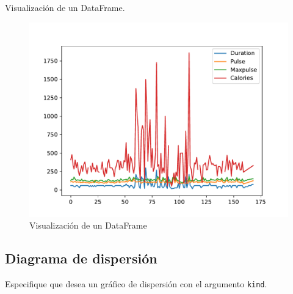 \begin{code} Visualización de un DataFrame.

\begin{Shaded}
\begin{Highlighting}[]

\OperatorTok{=}\NormalTok{)}


\end{Highlighting}
\end{Shaded}
\begin{figure}[H]
  \centering
  \includegraphics[scale=0.75]{img/grafica901.pdf}
  \caption{Visualización de un DataFrame}  
\end{figure}
\end{code}

\subsection{Diagrama de dispersión}

Especifique que desea un gráfico de dispersión con el argumento \texttt{kind}.
 
\begin{Shaded}
\begin{Highlighting}[]
\OperatorTok{=} 
\end{Highlighting}
\end{Shaded}

